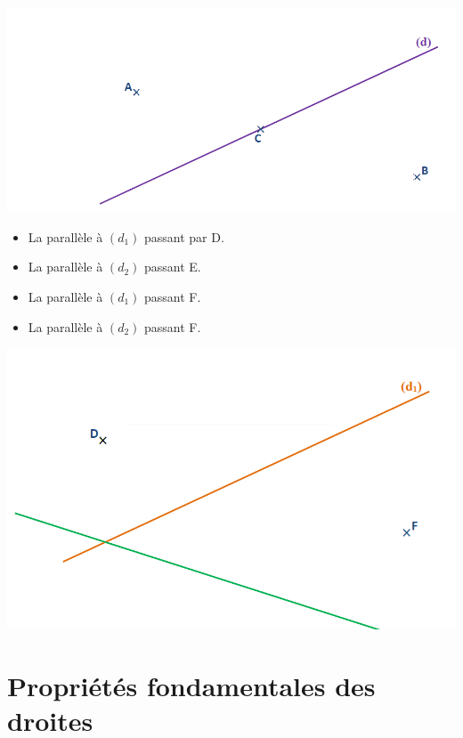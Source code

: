 \begin{center}
	\includegraphics[width=1\linewidth]{../../assets/images/6e/seq_02/ex1}
\end{center}


\begin{itemize}
	\item La parallèle à $(d_1)$ passant par D.
	\item La parallèle à $(d_2)$ passant E.
	\item La parallèle à $(d_1)$ passant F.
	\item La parallèle à $(d_2)$ passant F.
\end{itemize}

\begin{center}
	\includegraphics[width=1\linewidth]{../../assets/images/6e/seq_02/ex2}
\end{center}


\section{ Propriétés fondamentales des droites}

